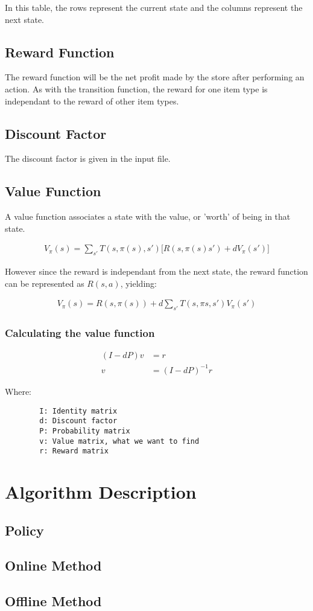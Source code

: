 \documentclass[12pt]{article}
\begin{document}
    In this table, the rows represent the current state and the columns represent the next state.

    \subsection{Reward Function}

    The reward function will be the net profit made by the store after performing an action. As with the transition function, the reward for one item type is independant to the reward of other item types.

    \subsection{Discount Factor}

    The discount factor is given in the input file.

    \subsection{Value Function}

    A value function associates a state with the value, or 'worth' of being in that state.

    \begin{align*}
        V_{\pi}(s) = \sum_{s'} T(s, \pi(s), s') \big[ R(s, \pi(s) s') + dV_{\pi}(s') \big]
    \end{align*}

    However since the reward is independant from the next state, the reward function can be represented as $R(s, a)$, yielding:

    \begin{align*}
        V_{\pi}(s) = R(s, \pi(s)) + d\sum_{s'}T(s, \pi{s}, s') V_{\pi}(s')
    \end{align*}

    \subsubsection{Calculating the value function}

    \begin{align*}
        (I - dP)v &= r\\
        v &= (I - dP)^{-1} r
    \end{align*}

    Where:
    \begin{verbatim}
        I: Identity matrix
        d: Discount factor
        P: Probability matrix
        v: Value matrix, what we want to find
        r: Reward matrix
    \end{verbatim}

    \section{Algorithm Description}

    \subsection{Policy}

    \subsection{Online Method}

    \subsection{Offline Method}
\end{document}
